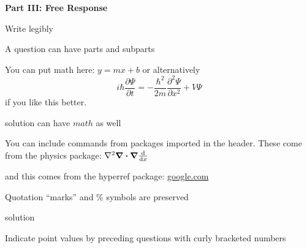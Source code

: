 \documentclass{exam}
\begin{document}
\newpage
\par\noindent \textbf{\large  Part III: Free Response}
\par\noindent  Write legibly
\begin{questions}
\setcounter{question}{21}
\question A question can have parts and subparts
\question You can put math here: $y=mx+b$ or alternatively \[i\hbar \frac{\partial \Psi}{\partial t} = -\frac{\hbar^2}{2m}\frac{\partial^2 \Psi}{\partial x^2} + V \Psi\] if you like this better.
	\begin{solution}[20 pt]
	solution can have $math$ as well
	\end{solution}
\question You can include commands from packages imported in the header. These come from the physics package: $\laplacian\div\grad\dv{x}$
	\begin{solution}[20 pt]
	and this comes from the hyperref package: \url{google.com}
	\end{solution}
\question Quotation ``marks'' and \% symbols are preserved
	\begin{solution}[20 pt]
	solution
	\end{solution}
\question[3]  Indicate point values by preceding questions with curly bracketed numbers
	\begin{parts}

\end{parts}
\end{questions}
\end{document}
